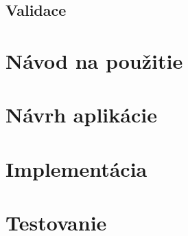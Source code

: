 \documentclass[a4paper,12pt]{article}
\begin{document}
\subsection{Validace}

\section{Návod na použitie}

\section{Návrh aplikácie}

\section{Implementácia}

\section{Testovanie}


 
\end{document}
